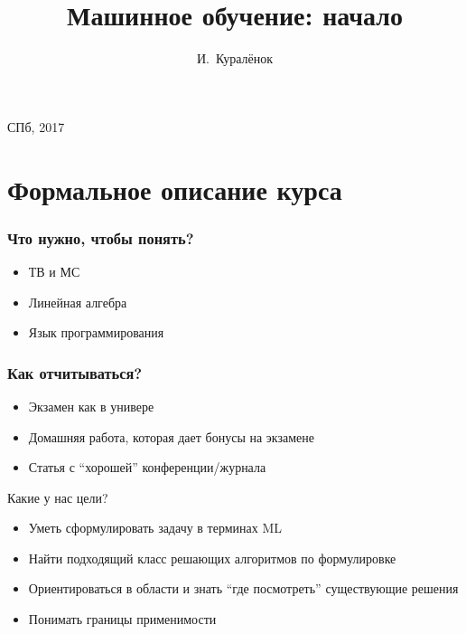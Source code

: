 \documentclass[14pt, fleqn, xcolor={dvipsnames, table}]{beamer}
\title{Машинное обучение: начало\\\small{}}
\author[]{\small{И.~Куралёнок}}
\date{}
\begin{document}
\begin{frame}
\maketitle
\small
\begin{center}
\vspace{-60pt}
\vspace{80pt}
\footnotesize СПб, 2017
\end{center}
\end{frame}

\section{Формальное описание курса}

\begin{frame}
\frametitle{Что нужно, чтобы понять?}
\begin{itemize}
	\item ТВ и МС
	\item Линейная алгебра
	\item Язык программирования
\end{itemize}
\end{frame}

\begin{frame}
\frametitle{Как отчитываться?}
\begin{itemize}
	\item Экзамен как в универе
	\item Домашняя работа, которая дает бонусы на экзамене
	\item Статья с ``хорошей'' конференции/журнала
\end{itemize}
\end{frame}

\begin{frame}{Какие у нас цели?}
\begin{itemize}
	\item Уметь сформулировать задачу в терминах ML
	\item Найти подходящий класс решающих алгоритмов по формулировке
	\item Ориентироваться в области и знать ``где посмотреть'' существующие решения
	\item Понимать границы применимости
\end{itemize}
\end{frame}
\end{document}
